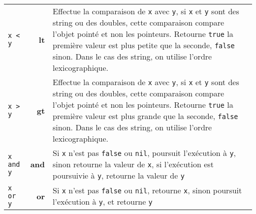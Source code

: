 \documentclass{article}
\begin{document}
\begin{longtable}{p{1.3cm} r p{12cm}}
  {\lstinline$x < y$} & \textbf{lt} & Effectue la comparaison de \texttt{x} avec \texttt{y}, si \texttt{x} et \texttt{y} sont des string ou des doubles, cette comparaison compare l'objet pointé et non les pointeurs. Retourne {\lstset{style=lua}\lstinline$true$} la première valeur est plus petite que la seconde, {\lstset{style=lua}\lstinline$false$} sinon. Dans le cas des string, on utilise l'ordre lexicographique.\\
  {\lstinline$x > y$} & \textbf{gt} & Effectue la comparaison de \texttt{x} avec \texttt{y}, si \texttt{x} et \texttt{y} sont des string ou des doubles, cette comparaison compare l'objet pointé et non les pointeurs. Retourne {\lstset{style=lua}\lstinline$true$} la première valeur est plus grande que la seconde, {\lstset{style=lua}\lstinline$false$} sinon. Dans le cas des string, on utilise l'ordre lexicographique.\\
  {\lstinline$x and y$} & \textbf{and} & Si \texttt{x} n'est pas {\lstset{style=lua}\lstinline$false$} ou {\lstset{style=lua}\lstinline$nil$}, poursuit l'exécution à \texttt{y}, sinon retourne la valeur de \texttt{x}, si l'exécution est poursuivie à \texttt{y}, retourne la valeur de \texttt{y}\\
  {\lstinline$x or y$} & \textbf{or} & Si \texttt{x} n'est pas {\lstset{style=lua}\lstinline$false$} ou {\lstset{style=lua}\lstinline$nil$}, retourne \texttt{x}, sinon poursuit l'exécution à \texttt{y}, et retourne \texttt{y}\\
  
\end{longtable}
\end{document}
